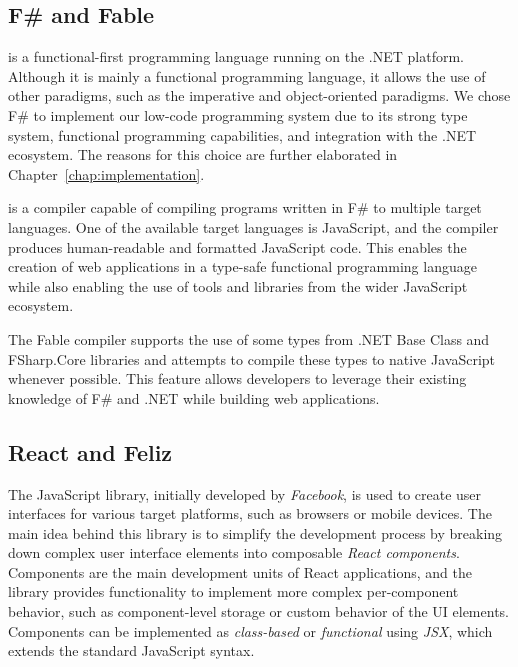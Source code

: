 \subsection{F\# and Fable}
\label{sub:Fable}

\citet{fsharp} is a functional-first programming language running on the .NET platform.
Although it is mainly a functional programming language, it allows the use of other paradigms, such as the imperative and object-oriented paradigms.
We chose F\# to implement our low-code programming system due to its strong type system, functional programming capabilities, and integration with the .NET ecosystem.
The reasons for this choice are further elaborated in Chapter~\ref{chap:implementation}.

\citet{fable} is a compiler capable of compiling programs written in F\# to multiple target languages.
One of the available target languages is JavaScript, and the compiler produces human-readable and formatted JavaScript code.
This enables the creation of web applications in a type-safe functional programming language while also enabling the use of tools and libraries from the wider JavaScript ecosystem.

The Fable compiler supports the use of some types from .NET Base Class and FSharp.Core libraries \cite{fable-comp} and attempts to compile these types to native JavaScript whenever possible.
This feature allows developers to leverage their existing knowledge of F\# and .NET while building web applications.

\subsection{React and Feliz}
The \citet{react} JavaScript library, initially developed by \emph{Facebook}, is used to create user interfaces for various target platforms, such as browsers or mobile devices.
The main idea behind this library is to simplify the development process by breaking down complex user interface elements into composable \emph{React components}.
Components are the main development units of React applications, and the library provides functionality to implement more complex per-component behavior, such as component-level storage or custom behavior of the UI elements.
Components can be implemented as \emph{class-based} or \emph{functional} using \emph{JSX}, which extends the standard JavaScript syntax.

